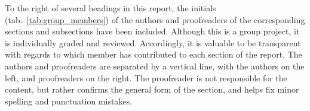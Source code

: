 To the right of several headings in this report, the initials (tab.~\ref{tab:group_members}) of the authors and proofreaders of the corresponding sections and subsections have been included.  Although this is a group project, it is individually graded and reviewed. Accordingly, it is valuable to be transparent with regards to which member has contributed to each section of the report. The authors and proofreaders are separated by a vertical line, with the authors on the left, and proofreaders on the right. The proofreader is not responsible for the content, but rather confirms the general form of the section, and helps fix minor spelling and punctuation mistakes.